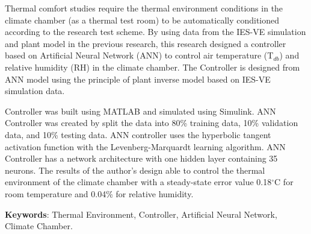 Thermal comfort studies require the thermal environment conditions in the climate chamber (as a thermal test room) to be automatically conditioned according to the research test scheme. By using data from the IES-VE simulation \cite{skripsiIchfan} and plant model \cite{skripsiTanto} in the previous research, this research designed a controller based on Artificial Neural Network (ANN) to control air temperature (T$_{db}$) and relative humidity (RH) in the climate chamber. The Controller is designed from ANN model using the principle of plant inverse model based on IES-VE simulation data.

Controller was built using MATLAB and simulated using Simulink. ANN Controller was created by split the data into 80\% training data, 10\% validation data, and 10\% testing data. ANN controller uses the hyperbolic tangent activation function with the Levenberg-Marquardt learning algorithm. ANN Controller has a network architecture with one hidden layer containing 35 neurons. The results of the author's design able to control the thermal environment of the climate chamber with a steady-state error value 0.18$^\circ$C for room temperature and 0.04\% for relative humidity.

\vspace{0.5cm}
\hspace{-1.2cm}
\textbf{Keywords}: Thermal Environment, Controller, Artificial Neural Network, Climate Chamber.


